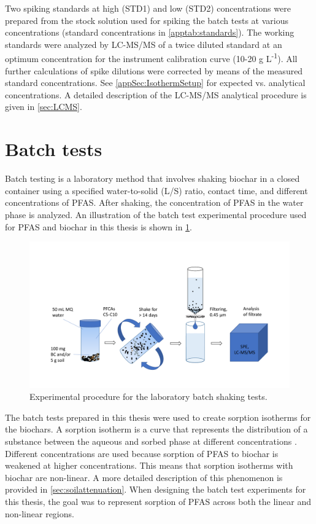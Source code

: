 Two spiking standards at high (STD1) and low (STD2) concentrations were prepared from the stock solution used for spiking the batch tests at various concentrations (standard concentrations in \cref{apptab:standards}). The working standards were analyzed by LC-MS/MS of a twice diluted standard at an optimum concentration for the instrument calibration curve (10-20 \textmu g L\textsuperscript{-1}). All further calculations of spike dilutions were corrected by means of the measured standard concentrations. See \cref{appSec:IsothermSetup} for expected vs. analytical concentrations. A detailed description of the LC-MS/MS analytical procedure is given in \cref{sec:LCMS}. 



\section{Batch tests \label{sec:batch}}
Batch testing is a laboratory method that involves shaking biochar in a closed container using a specified water-to-solid (L/S) ratio, contact time, and different concentrations of PFAS. After shaking, the concentration of PFAS in the water phase is analyzed. An illustration of the batch test experimental procedure used for PFAS and biochar in this thesis is shown in \cref{fig:batchtest_setup}.

\begin{figure}[htb]
    \centering
    \includegraphics[width=\textwidth,trim={0 2cm 0 3.2cm},clip]{Diagrams/Batch_test.pdf}
    \caption{Experimental procedure for the laboratory batch shaking tests.}
    \label{fig:batchtest_setup}
\end{figure}

The batch tests prepared in this thesis were used to create sorption isotherms for the biochars. A sorption isotherm is a curve that represents the distribution of a substance between the aqueous and sorbed phase at different concentrations \citep{limousin2007sorption}. Different concentrations are used because sorption of PFAS to biochar is weakened at higher concentrations. This means that sorption isotherms with biochar are non-linear. A more detailed description of this phenomenon is provided in \cref{sec:soilattenuation}. When designing the batch test experiments for this thesis, the goal was to represent sorption of PFAS across both the linear and non-linear regions.

